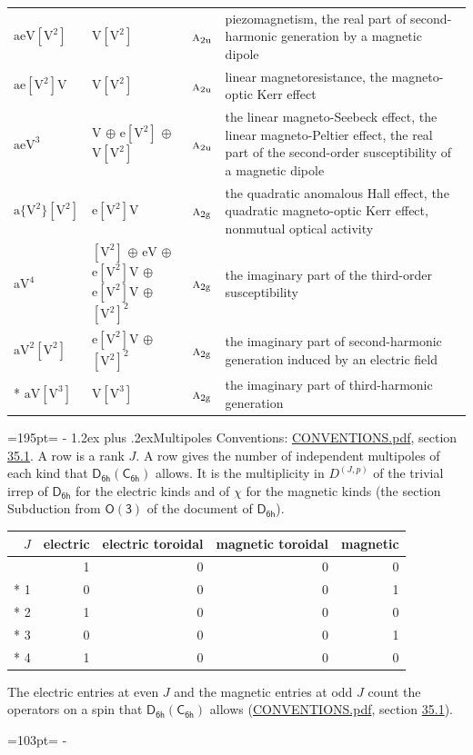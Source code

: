 \documentclass[10pt,a4paper]{article}
\makeatletter
\renewcommand\section{\@startsection{section}{1}{\z@}{-3ex plus -1ex minus -.2ex}%
  {1.2ex plus .2ex}{\normalfont\large\sffamily\bfseries\color{parttitle}}}
\newcommand{\needspace}[1]{\par\penalty-100\begingroup\dimen0=#1\relax\dimen2=\pagegoal
  \advance\dimen2-\pagetotal\ifdim\dimen0>\dimen2\relax\ifdim\dimen2>0pt\vfil\break\fi\fi
  \endgroup}
\numberwithin{equation}{section}
\newcommand{\grp}[1]{\mathsf{#1}}
\newcommand{\irr}[1]{\text{\normalfont\scshape #1}}
\newcommand{\ptag}[1]{\mathrm{#1}}
\newcommand{\irrJp}[2]{D^{(#1,#2)}}
\newcommand{\jahn}[1]{\mathrm{#1}}
\newlength{\fillwidth}\newlength{\cellwidth}\newlength{\colwidth}
\makeatother
\begin{document}
{\begin{longtable}{@{}lll>{\RaggedRight\arraybackslash}p{\fillwidth}@{}}
$\jahn{aeV[V^{2}]}$ & $\jahn{V[V^{2}]}$ & $\irr{a}_{2\ptag{u}}$ & piezomagnetism, the real part of second-harmonic generation by a magnetic dipole\\
$\jahn{ae[V^{2}]V}$ & $\jahn{V[V^{2}]}$ & $\irr{a}_{2\ptag{u}}$ & linear magnetoresistance, the magneto-optic Kerr effect\\
$\jahn{aeV^{3}}$ & $\jahn{V}$ $\oplus$ $\jahn{e[V^{2}]}$ $\oplus$ $\jahn{V[V^{2}]}$ & $\irr{a}_{2\ptag{u}}$ & the linear magneto-Seebeck effect, the linear magneto-Peltier effect, the real part of the second-order susceptibility of a magnetic dipole\\
$\jahn{a\{V^{2}\}[V^{2}]}$ & $\jahn{e[V^{2}]V}$ & $\irr{a}_{2\ptag{g}}$ & the quadratic anomalous Hall effect, the quadratic magneto-optic Kerr effect, nonmutual optical activity\\
$\jahn{aV^{4}}$ & $\jahn{[V^{2}]}$ $\oplus$ $\jahn{eV}$ $\oplus$ $\jahn{e[V^{2}]V}$ $\oplus$ $\jahn{e[V^{2}]V}$ $\oplus$ $\jahn{[V^{2}]^{2}}$ & $\irr{a}_{2\ptag{g}}$ & the imaginary part of the third-order susceptibility\\
$\jahn{aV^{2}[V^{2}]}$ & $\jahn{e[V^{2}]V}$ $\oplus$ $\jahn{[V^{2}]^{2}}$ & $\irr{a}_{2\ptag{g}}$ & the imaginary part of second-harmonic generation induced by an electric field\\*
$\jahn{aV[V^{3}]}$ & $\jahn{V[V^{3}]}$ & $\irr{a}_{2\ptag{g}}$ & the imaginary part of third-harmonic generation\\
\bottomrule\end{longtable}}
\needspace{195pt}
\section{Multipoles}\label{s:multipoles}
Conventions: \href{../../CONVENTIONS.pdf}{CONVENTIONS.pdf}, section \href{../../CONVENTIONS.pdf\#conv.35.1}{35.1}.
A row is a rank $J$. \label{n:head.multipole.electric}\label{n:head.multipole.electric.toroidal}\label{n:head.multipole.magnetic.toroidal}\label{n:head.multipole.magnetic}A row gives the number of independent multipoles of each kind that $\grp{D_{6h}}(\grp{C_{6h}})$ allows. It is the multiplicity in $\irrJp{J}{p}$ of the trivial irrep of $\grp{D_{6h}}$ for the electric kinds and of $\chi$ for the magnetic kinds (the section Subduction from $\grp{O(3)}$ of the document of \href{../../../rotation/data/pdf/D6h.pdf}{$\grp{D_{6h}}$}).
{\small\begin{longtable}{@{}rrrrr@{}}\toprule
$J$ & electric & electric toroidal & magnetic toroidal & magnetic\\\midrule\endhead
\bottomrule\endfoot\endlastfoot
0 & 1 & 0 & 0 & 0\\*
1 & 0 & 0 & 0 & 1\\*
2 & 1 & 0 & 0 & 0\\*
3 & 0 & 0 & 0 & 1\\*
4 & 1 & 0 & 0 & 0\\
\bottomrule\end{longtable}}
The electric entries at even $J$ and the magnetic entries at odd $J$ count the operators on a spin that $\grp{D_{6h}}(\grp{C_{6h}})$ allows (\href{../../CONVENTIONS.pdf}{CONVENTIONS.pdf}, section \href{../../CONVENTIONS.pdf\#conv.35.1}{35.1}).
\needspace{103pt}
\end{document}
